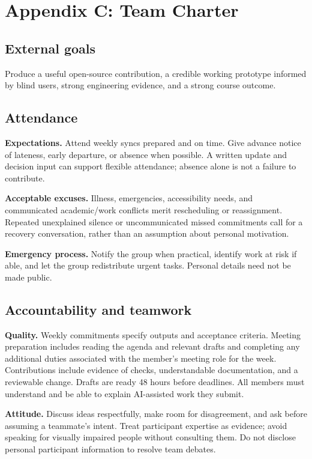 \documentclass[11pt]{article}
\begin{document}
\section*{Appendix C: Team Charter}

\subsection*{External goals}
Produce a useful open-source contribution, a credible working prototype informed
by blind users, strong engineering evidence, and a strong course outcome.

\subsection*{Attendance}
\textbf{Expectations.} Attend weekly syncs prepared and on time. Give advance
notice of lateness, early departure, or absence when possible. A written update
and decision input can support flexible attendance; absence alone is not a
failure to contribute.

\textbf{Acceptable excuses.} Illness, emergencies, accessibility needs, and
communicated academic/work conflicts merit rescheduling or reassignment. Repeated
unexplained silence or uncommunicated missed commitments call for a recovery
conversation, rather than an assumption about personal motivation.

\textbf{Emergency process.} Notify the group when practical, identify work at
risk if able, and let the group redistribute urgent tasks. Personal details need
not be made public.

\subsection*{Accountability and teamwork}
\textbf{Quality.} Weekly commitments specify outputs and acceptance criteria.
Meeting preparation includes reading the agenda and relevant drafts and completing
any additional duties associated with the member's meeting role for the week. Contributions
include evidence of checks, understandable documentation, and a reviewable change.
Drafts are ready 48 hours before deadlines. All members must understand and be
able to explain AI-assisted work they submit.

\textbf{Attitude.} Discuss ideas respectfully, make room for disagreement, and
ask before assuming a teammate's intent. Treat participant expertise as evidence;
avoid speaking for visually impaired people without consulting them. Do not disclose personal
participant information to resolve team debates.
\end{document}

